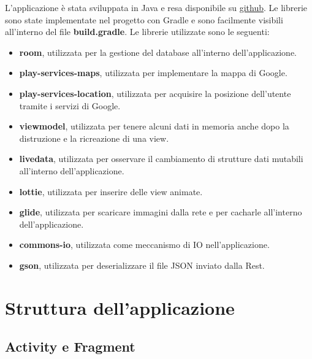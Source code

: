 \documentclass{article}
\begin{document}
L'applicazione è stata sviluppata in Java e resa disponibile su \href{https://github.com/Walrus98/voxelgo-android}{github}. Le librerie sono state implementate nel progetto con Gradle e sono facilmente visibili all'interno del
file \textbf{build.gradle}. Le librerie utilizzate sono le seguenti:
\begin{itemize}
    \itemsep 0em 
    \item \textbf{room}, utilizzata per la gestione del database all'interno dell'applicazione.
    \item \textbf{play-services-maps}, utilizzata per implementare la mappa di Google.
    \item \textbf{play-services-location}, utilizzata per acquisire la posizione dell'utente tramite i servizi di Google.
    \item \textbf{viewmodel}, utilizzata per tenere alcuni dati in memoria anche dopo la distruzione e la ricreazione di una view.
    \item \textbf{livedata}, utilizzata per osservare il cambiamento di strutture dati mutabili all'interno dell'applicazione.
    \item \textbf{lottie}, utilizzata per inserire delle view animate.
    \item \textbf{glide}, utilizzata per scaricare immagini dalla rete e per cacharle all'interno dell'applicazione.
    \item \textbf{commons-io}, utilizzata come meccanismo di IO nell'applicazione.
    \item \textbf{gson}, utilizzata per deserializzare il file JSON inviato dalla Rest.
\end{itemize}

\section{Struttura dell'applicazione}

\subsection{Activity e Fragment}
\end{document}
